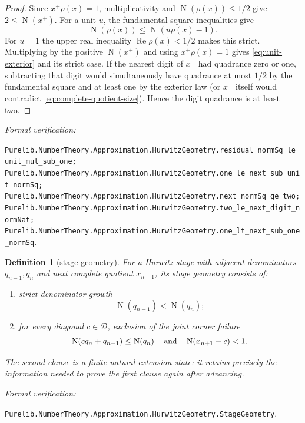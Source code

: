 \documentclass[11pt]{article}
\newtheorem{definition}[definition]{Definition}
\newcommand{\Norm}[1]{\operatorname{N}\!\left(#1\right)}
\newcommand{\leanref}[1]{\par\smallskip\noindent
  \emph{Formal verification:}\par\nobreak
  {\raggedright\nolinkurl{#1}.\par}}
\begin{document}
\begin{proof}
Since $x^+\rho(x)=1$, multiplicativity and
$\Norm{\rho(x)}\le1/2$ give $2\le\Norm{x^+}$.  For a unit $u$, the
fundamental-square inequalities give
\[
                 \Norm{\rho(x)}
          \le \Norm{u\rho(x)-1}.
\]
For $u=1$ the upper real inequality
$\operatorname{Re}\rho(x)<1/2$ makes this strict.  Multiplying by the
positive $\Norm{x^+}$ and using $x^+\rho(x)=1$ gives
\eqref{eq:unit-exterior} and its strict case.  If the nearest digit of $x^+$
had quadrance zero or one, subtracting that digit would simultaneously have
quadrance at most $1/2$ by the fundamental square and at least one by the
exterior law (or $x^+$ itself would contradict
\eqref{eq:complete-quotient-size}).  Hence the digit quadrance is at least
two.
\end{proof}

\leanref{Purelib.NumberTheory.Approximation.HurwitzGeometry.residual_normSq_le_unit_mul_sub_one;
Purelib.NumberTheory.Approximation.HurwitzGeometry.one_le_next_sub_unit_normSq;
Purelib.NumberTheory.Approximation.HurwitzGeometry.next_normSq_ge_two;
Purelib.NumberTheory.Approximation.HurwitzGeometry.two_le_next_digit_normNat;
Purelib.NumberTheory.Approximation.HurwitzGeometry.one_lt_next_sub_one_normSq}

\begin{definition}[stage geometry]
\label{def:stage-geometry}
For a Hurwitz stage with adjacent denominators $q_{n-1},q_n$ and next
complete quotient $x_{n+1}$, its \emph{stage geometry} consists of:
\begin{enumerate}[label=(\roman*)]
\item strict denominator growth
\begin{equation}
\label{eq:denominator-growth}
                         \Norm{q_{n-1}}<\Norm{q_n};
\end{equation}
\item for every diagonal $c\in\mathcal D$, exclusion of the joint corner
failure
\begin{equation}
\label{eq:corner-failure}
 \Norm{cq_n+q_{n-1}}\le\Norm{q_n}
 \quad\hbox{and}\quad
 \Norm{x_{n+1}-c}<1.
\end{equation}
\end{enumerate}
The second clause is a finite natural-extension state: it retains precisely
the information needed to prove the first clause again after advancing.
\end{definition}

\leanref{Purelib.NumberTheory.Approximation.HurwitzGeometry.StageGeometry}
\end{document}
